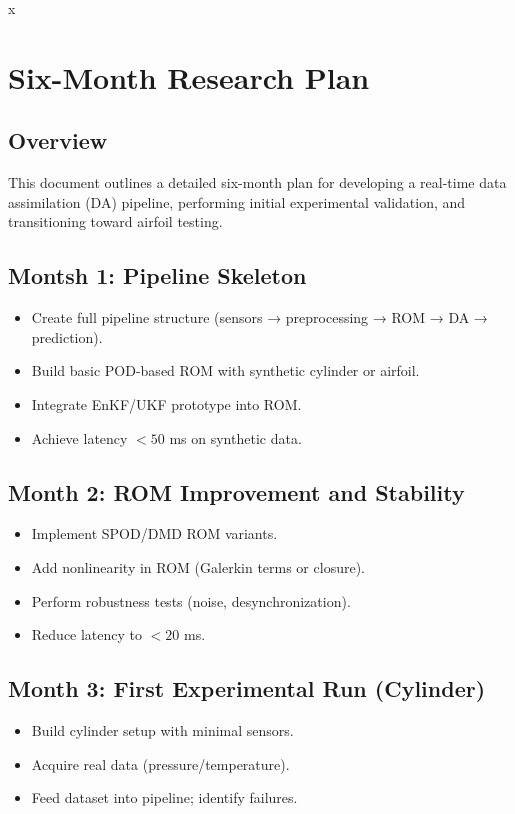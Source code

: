 
\usepackage[utf8]{inputenc}
\usepackage[T1]{fontenc}
\usepackage[spanish]{babel}
\usepackage{amsmath, amssymb}
\usepackage{graphicx}
\usepackage{enumitem}
\usepackage{geometry}x
\geometry{margin=2.5cm}
\usepackage{float}
\usepackage{caption}

\title{}
\author{}
\date{}



\section*{Six-Month Research Plan}
\subsection*{Overview}
This document outlines a detailed six-month plan for developing a real-time data assimilation (DA) pipeline, performing initial experimental validation, and transitioning toward airfoil testing.

\subsection*{Montsh 1: Pipeline Skeleton}
\begin{itemize}
\item Create full pipeline structure (sensors → preprocessing → ROM → DA → prediction).
\item Build basic POD-based ROM with synthetic cylinder or airfoil.
\item Integrate EnKF/UKF prototype into ROM.
\item Achieve latency $<50$ ms on synthetic data.
\end{itemize}

\subsection*{Month 2: ROM Improvement and Stability}
\begin{itemize}
\item Implement SPOD/DMD ROM variants.
\item Add nonlinearity in ROM (Galerkin terms or closure).
\item Perform robustness tests (noise, desynchronization).
\item Reduce latency to $<20$ ms.
\end{itemize}

\subsection*{Month 3: First Experimental Run (Cylinder)}
\begin{itemize}
\item Build cylinder setup with minimal sensors.
\item Acquire real data (pressure/temperature).
\item Feed dataset into pipeline; identify failures.
\end{itemize}

